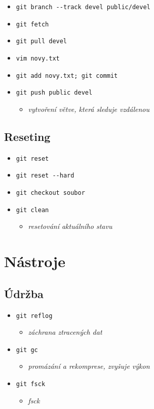 \documentclass[10pt,twocolumn]{article}
\begin{document}
\begin{itemize}
	\item \texttt{git branch {-}{-}track devel public/devel}
	\item \texttt{git fetch}
	\item \texttt{git pull devel}
	\item \texttt{vim novy.txt}
	\item \texttt{git add novy.txt; git commit}
	\item \texttt{git push public devel}
	\begin{itemize} \item \textit{vytvoření větve, která sleduje vzdálenou} \end{itemize}
\end{itemize}

\subsection{Reseting}

\begin{itemize}
	\item \texttt{git reset}
	\item \texttt{git reset {-}{-}hard}
	\item \texttt{git checkout soubor}
	\item \texttt{git clean}
	\begin{itemize} \item \textit{resetování aktuálního stavu} \end{itemize}
\end{itemize}

\section{Nástroje}

\subsection{Údržba}

\begin{itemize}
	\item \texttt{git reflog}
	\begin{itemize} \item \textit{záchrana ztracených dat} \end{itemize}
	\item \texttt{git gc}
	\begin{itemize} \item \textit{promázání a rekomprese, zvyšuje výkon} \end{itemize}
	\item \texttt{git fsck}
	\begin{itemize} \item \textit{fsck} \end{itemize}
\end{itemize}
\end{document}
